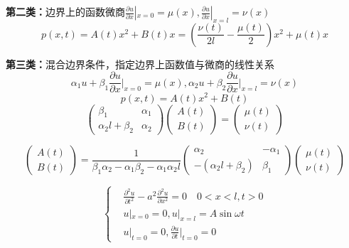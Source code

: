     \textbf{第二类：}边界上的函数微商$\frac{\partial{u}}{\partial x}|_{x=0}=\mu(x),\frac{\partial{u}}{\partial x}|_{x=l}=\nu(x)$
    $$p(x,t)=A(t)x^2+B(t)x=\left(\frac{\nu(t)}{2l}-\frac{\mu(t)}{2}\right)x^2+\mu(t)x$$
    
    \textbf{第三类：}混合边界条件，指定边界上函数值与微商的线性关系
    $$\alpha_1u+\beta_1\frac{\partial{u}}{\partial x}\big|_{x=0}=\mu(x),\alpha_2u+\beta_2\frac{\partial{u}}{\partial x}\big|_{x=l}=\nu(x)$$
    $$p(x,t)=A(t)x^2+B(t)$$
    $$\left( \begin{array}{ccc}
        \beta_1 & \alpha_1 \\
        \alpha_2l+\beta_2 & \alpha_2 
        \end{array} 
        \right )
        \left( \begin{array}{ccc}
        A(t) \\
        B(t)
        \end{array} 
        \right )
        =
        \left( \begin{array}{ccc}
        \mu(t) \\
        \nu(t)
        \end{array} 
    \right )$$
    
    $$\left( \begin{array}{ccc}
        A(t) \\
        B(t)
        \end{array} 
        \right )
        =\frac{1}{\beta_1\alpha_2-\alpha_1\beta_2-\alpha_1\alpha_2l}\left( \begin{array}{ccc}
        \alpha_2 & -\alpha_1 \\
        -(\alpha_2l+\beta_2) & \beta_1
        \end{array} 
        \right )
        \left( \begin{array}{ccc}
        \mu(t) \\
        \nu(t)
            \end{array} 
    \right )$$

\begin{ex}[弦受迫振动]
    $$\left\{
        \begin{aligned}
        &
        \frac{\partial^2{u}}{\partial{t}^2}-a^2\frac{\partial^2{u}}{\partial{x}^2}=0\quad 0<x<l,t>0\\
        &u|_{x=0}=0,u|_{x=l}=A\sin\omega t\\
        &u|_{t=0}=0,\frac{\partial{u}}{\partial t}\bigg|_{t=0}=0
                \end{aligned}
        \right.$$
\end{ex}

